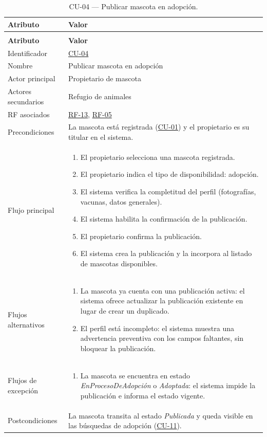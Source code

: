 \documentclass[journal,onecolumn]{IEEEtran}
\makeatletter
\newenvironment{atributos}[2]{%
	\small
	\begin{longtable}{@{}>{\raggedright\arraybackslash}p{4.2cm} >{\raggedright\arraybackslash}p{11.2cm}@{}}
		\caption{#2}\label{tab:#1}\\
		\toprule
		\textbf{Atributo} & \textbf{Valor} \\
		\midrule
		\endfirsthead
		\multicolumn{2}{@{}l}{\small\itshape (continuación)}\\
		\toprule
		\textbf{Atributo} & \textbf{Valor} \\
		\midrule
		\endhead
		\bottomrule
		\endlastfoot
	}{%
	\end{longtable}
	\normalsize
}
\makeatother
\begin{document}
	\begin{atributos}{CU-04}{CU-04 --- Publicar mascota en adopción.}
		Identificador & \hyperref[tab:CU-04]{CU-04} \\
		Nombre & Publicar mascota en adopción \\
		Actor principal & Propietario de mascota \\
		Actores secundarios & Refugio de animales \\
		RF asociados & \hyperref[tab:RF-13]{RF-13}, \hyperref[tab:RF-05]{RF-05} \\
		Precondiciones & La mascota está registrada (\hyperref[tab:CU-01]{CU-01}) y el propietario es su titular en el sistema. \\
		Flujo principal &
		\begin{enumerate}[leftmargin=*, nosep]
			\item El propietario selecciona una mascota registrada.
			\item El propietario indica el tipo de disponibilidad: adopción.
			\item El sistema verifica la completitud del perfil (fotografías, vacunas, datos generales).
			\item El sistema habilita la confirmación de la publicación.
			\item El propietario confirma la publicación.
			\item El sistema crea la publicación y la incorpora al listado de mascotas disponibles.
		\end{enumerate} \\
		Flujos alternativos &
		\begin{enumerate}[leftmargin=*, nosep]
			\item[1.1] La mascota ya cuenta con una publicación activa: el sistema ofrece actualizar la publicación existente en lugar de crear un duplicado.
			\item[3.1] El perfil está incompleto: el sistema muestra una advertencia preventiva con los campos faltantes, sin bloquear la publicación.
		\end{enumerate} \\
		Flujos de excepción &
		\begin{enumerate}[leftmargin=*, nosep]
			\item[6.1] La mascota se encuentra en estado \emph{EnProcesoDeAdopción} o \emph{Adoptada}: el sistema impide la publicación e informa el estado vigente.
		\end{enumerate} \\
		Postcondiciones & La mascota transita al estado \emph{Publicada} y queda visible en las búsquedas de adopción (\hyperref[tab:CU-11]{CU-11}). \\
	\end{atributos}
	
\end{document}
